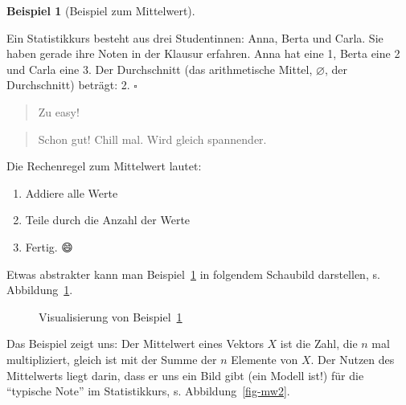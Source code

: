 \documentclass[
  letterpaper,
  oneside,
  open=any]{scrbook}
\providecommand{\tightlist}{%
  \setlength{\itemsep}{0pt}\setlength{\parskip}{0pt}}\usepackage{longtable,booktabs,array}
\theoremstyle{definition}
\theoremstyle{definition}
\newtheorem{example}{Beispiel}[chapter]
\theoremstyle{definition}
\theoremstyle{remark}
\begin{document}
\begin{example}[Beispiel zum
Mittelwert]\protect\hypertarget{exm-mw}{}\label{exm-mw}

Ein Statistikkurs besteht aus drei Studentinnen: Anna, Berta und Carla.
Sie haben gerade ihre Noten in der Klausur erfahren. Anna hat eine 1,
Berta eine 2 und Carla eine 3. Der Durchschnitt (das arithmetische
Mittel, \(\varnothing\), der Durchschnitt) beträgt: 2. \(\square\)

\end{example}

\begin{quote}
{} Zu easy!
\end{quote}

\begin{quote}
{} Schon gut! Chill mal. Wird gleich spannender.
\end{quote}

Die Rechenregel zum Mittelwert lautet:

\begin{enumerate}
\def\labelenumi{\arabic{enumi}.}
\tightlist
\item
  Addiere alle Werte
\item
  Teile durch die Anzahl der Werte
\item
  Fertig. 😄
\end{enumerate}

Etwas abstrakter kann man Beispiel~\ref{exm-mw} in folgendem Schaubild
darstellen, s. Abbildung~\ref{fig-eq-mw}.

\begin{figure}


\caption{\label{fig-eq-mw}Visualisierung von Beispiel~\ref{exm-mw}}

\end{figure}%

Das Beispiel zeigt uns: Der Mittelwert eines Vektors \(X\) ist die Zahl,
die \(n\) mal multipliziert, gleich ist mit der Summe der \(n\) Elemente
von \(X\). Der Nutzen des Mittelwerts liegt darin, dass er uns ein Bild
gibt (ein Modell ist!) für die \enquote{typische Note} im Statistikkurs,
s. Abbildung~\ref{fig-mw2}.
\end{document}
